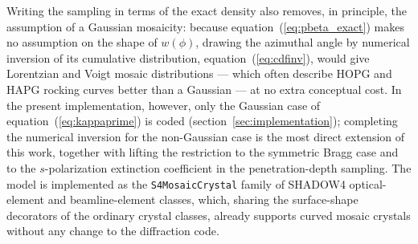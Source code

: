 \documentclass{iucr}
\begin{document}
Writing the sampling in terms of the exact density also removes, in principle, the
assumption of a Gaussian mosaicity: because equation~(\ref{eq:pbeta_exact}) makes
no assumption on the shape of $w(\phi)$, drawing the azimuthal angle by numerical
inversion of its cumulative distribution, equation~(\ref{eq:cdfinv}), would give
Lorentzian and Voigt mosaic distributions --- which often describe HOPG and HAPG
rocking curves better than a Gaussian \cite{Gerlach2015, Schlesiger2017, Smid2021}
--- at no extra conceptual cost. In the present implementation, however, only the
Gaussian case of equation~(\ref{eq:kappaprime}) is coded (section~\ref{sec:implementation});
completing the numerical inversion for the non-Gaussian case is the most direct
extension of this work, together with lifting the restriction to the symmetric
Bragg case and to the $s$-polarization extinction coefficient in the
penetration-depth sampling. The model is implemented as the
\texttt{S4MosaicCrystal} family of SHADOW4 optical-element and beamline-element
classes, which, sharing the surface-shape decorators of the ordinary crystal
classes, already supports curved mosaic crystals without any change to the
diffraction code.
\end{document}
